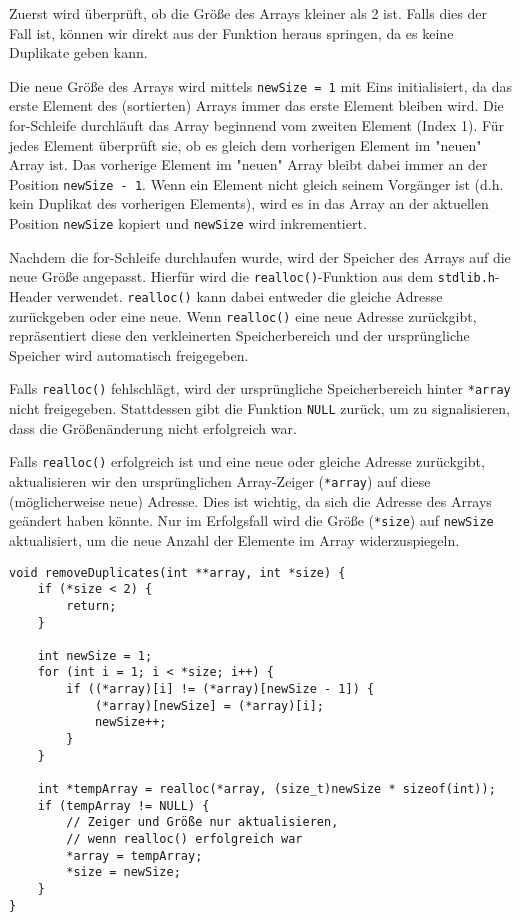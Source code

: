 Zuerst wird überprüft, ob die Größe des Arrays kleiner als 2 ist. Falls dies der
Fall ist, können wir direkt aus der Funktion heraus springen, da es keine
Duplikate geben kann.

Die neue Größe des Arrays wird mittels \texttt{newSize = 1} mit Eins
initialisiert, da das erste Element des (sortierten) Arrays immer das erste
Element bleiben wird. Die for-Schleife durchläuft das Array beginnend vom
zweiten Element (Index 1). Für jedes Element überprüft sie, ob es gleich dem
vorherigen Element im "neuen" Array ist. Das vorherige Element im "neuen" Array
bleibt dabei immer an der Position \texttt{newSize - 1}. Wenn ein Element
nicht gleich seinem Vorgänger ist (d.h. kein Duplikat des vorherigen Elements),
wird es in das Array an der aktuellen Position \texttt{newSize} kopiert
und \texttt{newSize} wird inkrementiert.

Nachdem die for-Schleife durchlaufen wurde, wird der Speicher des Arrays auf die
neue Größe angepasst. Hierfür wird die \texttt{realloc()}-Funktion aus
dem \texttt{stdlib.h}-Header verwendet. \texttt{realloc()} kann
dabei entweder die gleiche Adresse zurückgeben oder eine neue. Wenn
\texttt{realloc()} eine neue Adresse zurückgibt, repräsentiert diese den
verkleinerten Speicherbereich und der ursprüngliche Speicher wird automatisch
freigegeben.

Falls \texttt{realloc()} fehlschlägt, wird der ursprüngliche
Speicherbereich hinter \texttt{*array} nicht freigegeben. Stattdessen
gibt die Funktion \texttt{NULL} zurück, um zu signalisieren, dass die
Größenänderung nicht erfolgreich war.

Falls \texttt{realloc()} erfolgreich ist und eine neue oder gleiche
Adresse zurückgibt, aktualisieren wir den ursprünglichen Array-Zeiger
(\texttt{*array}) auf diese (möglicherweise neue) Adresse. Dies ist
wichtig, da sich die Adresse des Arrays geändert haben könnte. Nur im
Erfolgsfall wird die Größe (\texttt{*size}) auf \texttt{newSize}
aktualisiert, um die neue Anzahl der Elemente im Array widerzuspiegeln.

\begin{verbatim}
void removeDuplicates(int **array, int *size) {
    if (*size < 2) {
        return;
    }

    int newSize = 1;
    for (int i = 1; i < *size; i++) {
        if ((*array)[i] != (*array)[newSize - 1]) {
            (*array)[newSize] = (*array)[i];
            newSize++;
        }
    }

    int *tempArray = realloc(*array, (size_t)newSize * sizeof(int));
    if (tempArray != NULL) {
        // Zeiger und Größe nur aktualisieren,
        // wenn realloc() erfolgreich war
        *array = tempArray;
        *size = newSize;
    }
}
\end{verbatim}
